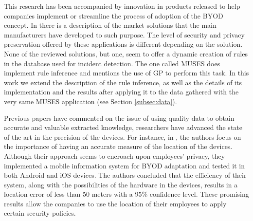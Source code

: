 \documentclass[a4paper,10pt,twocolumn,preprint,3p]{elsarticle}
\begin{document}
This research has been accompanied by innovation in products released
to help companies implement or streamline the process of adoption of the BYOD
concept. In \cite{de2015corporate} there is a description of the
market solutions that the main manufacturers have developed to such
purpose. The level of security and privacy preservation offered by
these applications is different depending on the solution. %
None of the reviewed solutions, but one, seem to offer a dynamic creation of rules in the database used for incident detection. The one called MUSES does implement rule inference and mentions the use of GP to perform this task. In this work we extend the description of the rule inference, as well as the details of its implementation and the results after applying it to the data gathered with the very same MUSES application (see Section \ref{subsec:data}).

Previous papers have commented on the issue of using quality data to obtain accurate and valuable extracted knowledge,
researchers have advanced the state of the art in the precision of the
devices. For instance, in \cite{rios2015mobile}, the authors focus on
the importance of having an accurate measure of the location of the
devices. Although their approach seems to encroach upon employees'
privacy, they implemented a mobile information system for BYOD
adaptation and tested it in both Android and iOS devices. The authors
concluded that the efficiency of their system, along with the
possibilities of the hardware in the devices, results in a location
error of less than 50 meters with a 95\% confidence level. These
promising results allow the companies to use the location of their
employees to apply certain security policies.   
\end{document}
